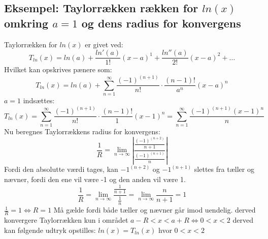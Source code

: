 \subsection*{\textbf{Eksempel:} Taylorrækken rækken for $ln(x)$ omkring $a = 1$ og dens radius for konvergens} %
Taylorrækken for $ln(x)$ er givet ved:
\[
    T_{ln}(x) = ln(a) + \frac{ln'(a)}{1!}(x-a)^1 + \frac{ln''(a)}{2!}(x-a)^2 + \ldots
\]
Hvilket kan opskrives pænere som:
\[
    T_{ln}(x) = ln(a) + \sum^{\infty}_{n = 1} \frac{(-1)^{(n+1)}}{n!} \cdot \frac{(n-1)!}{a^n} (x-a)^{n}
\]
$a = 1$ indsættes:
\[
    T_{ln}(x) = \sum^{\infty}_{n = 1} \frac{(-1)^{(n+1)}}{n!} \cdot \frac{(n-1)!}{1} (x-1)^{n}
    = \sum^{\infty}_{n = 1} \frac{(-1)^{(n+1)}(x-1)^{n}}{n}
\]
Nu beregnes Taylorrækkens radius for konvergens: 
\[
    \frac{1}{R} = \lim_{n \rightarrow \infty} \left\lvert \frac{\frac{(-1)^{(n+2)}}{n+1}}{\frac{(-1)^{(n+1)}}{n}} \right\lvert
\]
Fordi den absolutte værdi tages, kan $-1^{(n+2)}$ og $-1^{(n + 1)}$ slettes fra tæller og nævner,
fordi den ene vil være -1 og den anden vil være 1.
\[
    \frac{1}{R} = \lim_{n \rightarrow \infty} \frac{\frac{1}{n+1}}{\frac{1}{n}} = \lim_{n \rightarrow \infty} \frac{n}{n+1} = 1
\]
$\frac{1}{R} = 1 \Leftrightarrow R = 1$ Må gælde fordi både tæller og nævner går imod uendelig. derved konvergere Taylorrækken
kun i området $a-R < x < a+R \Leftrightarrow 0 < x < 2$ derved kan følgende udtryk opstilles: $ln(x) = T_{ln}(x)$ hvor $ 0 < x < 2$